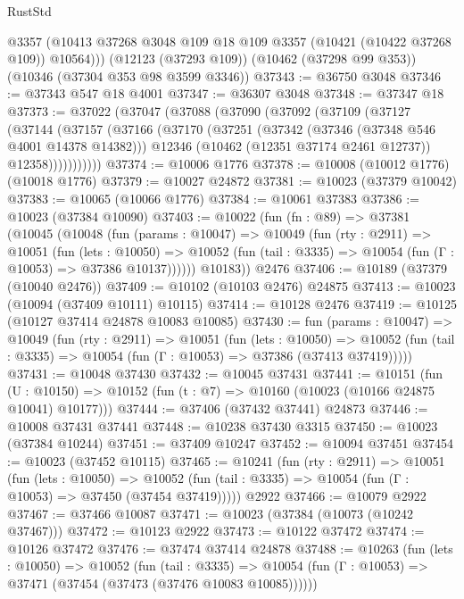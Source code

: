 \begin{lexlean}{RustStd}
\begin{coremodule}
        @3357
        (@10413 @37268 @3048 @109 @18 @109 @3357 (@10421 (@10422 @37268 @109)) @10564)))
    (@12123 (@37293 @109))
    (@10462 (@37298 @99 @353))
    (@10346 (@37304 @353 @98 @3599 @3346))
@37343 := @36750 @3048
@37346 := @37343 @547 @18 @4001
@37347 := @36307 @3048
@37348 := @37347 @18
@37373 := @37022
    (@37047
      (@37088
        (@37090
          (@37092
            (@37109
              (@37127
                (@37144
                  (@37157
                    (@37166
                      (@37170
                        (@37251
                          (@37342 (@37346 (@37348 @546 @4001 @14378 @14382)))
                          @12346
                          (@10462 (@12351 @37174 @2461 @12737))
                          @12358)))))))))))
@37374 := @10006 @1776
@37378 := @10008 (@10012 @1776) (@10018 @1776)
@37379 := @10027 @24872
@37381 := @10023 (@37379 @10042)
@37383 := @10065 (@10066 @1776)
@37384 := @10061 @37383
@37386 := @10023 (@37384 @10090)
@37403 := @10022
    (fun (fn : @89) =>
    @37381
      (@10045
        (@10048
          (fun (params : @10047) =>
          @10049
            (fun (rty : @2911) =>
            @10051
              (fun (lets : @10050) =>
              @10052 (fun (tail : @3335) => @10054 (fun (Γ : @10053) => @37386 @10137))))))
        @10183))
    @2476
@37406 := @10189 (@37379 (@10040 @2476))
@37409 := @10102 (@10103 @2476) @24875
@37413 := @10023 (@10094 (@37409 @10111) @10115)
@37414 := @10128 @2476
@37419 := @10125 (@10127 @37414 @24878 @10083 @10085)
@37430 := fun (params : @10047) =>
  @10049
    (fun (rty : @2911) =>
    @10051
      (fun (lets : @10050) =>
      @10052 (fun (tail : @3335) => @10054 (fun (Γ : @10053) => @37386 (@37413 @37419)))))
@37431 := @10048 @37430
@37432 := @10045 @37431
@37441 := @10151
    (fun (U : @10150) => @10152 (fun (t : @7) => @10160 (@10023 (@10166 @24875 @10041) @10177)))
@37444 := @37406 (@37432 @37441) @24873
@37446 := @10008 @37431 @37441
@37448 := @10238 @37430 @3315
@37450 := @10023 (@37384 @10244)
@37451 := @37409 @10247
@37452 := @10094 @37451
@37454 := @10023 (@37452 @10115)
@37465 := @10241
    (fun (rty : @2911) =>
    @10051
      (fun (lets : @10050) =>
      @10052 (fun (tail : @3335) => @10054 (fun (Γ : @10053) => @37450 (@37454 @37419)))))
    @2922
@37466 := @10079 @2922
@37467 := @37466 @10087
@37471 := @10023 (@37384 (@10073 (@10242 @37467)))
@37472 := @10123 @2922
@37473 := @10122 @37472
@37474 := @10126 @37472
@37476 := @37474 @37414 @24878
@37488 := @10263
    (fun (lets : @10050) =>
    @10052
      (fun (tail : @3335) =>
      @10054 (fun (Γ : @10053) => @37471 (@37454 (@37473 (@37476 @10083 @10085))))))

\end{coremodule}
\end{lexlean}
